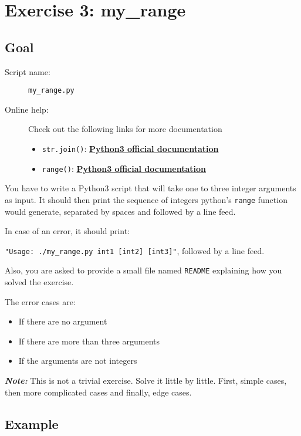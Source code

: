 \documentclass[12pt]{article}
\let\oldhref\href
\renewcommand{\href}[2]{\oldhref{#1}{\bfseries#2}}
\begin{document}
\section{Exercise 3: my\_range}
\subsection{Goal}

\begin{description}
        \item[Script name:] \texttt{my\_range.py}
        \item[Online help:] Check out the following links for more documentation
	\begin{itemize}
		\item \texttt{str.join()}: \href{https://docs.python.org/3.5/library/stdtypes.html\#str.join}{Python3 official documentation}
		\item \texttt{range()}: \href{https://docs.python.org/3.5/library/stdtypes.html\#range}{Python3 official documentation}
	\end{itemize}
\end{description}

You have to write a Python3 script that will take one to three integer arguments as input.
It should then print the sequence of integers python's \texttt{range} function would generate, separated by spaces and followed by a line feed.

In case of an error, it should print:

\texttt{"Usage: ./my\_range.py int1 [int2] [int3]"}, followed by a line feed.

Also, you are asked to provide a small file named \texttt{README} explaining how you solved the exercise.

The error cases are:

\begin{itemize}
	\item If there are no argument
	\item If there are more than three arguments
	\item If the arguments are not integers
\end{itemize}

\textit{\textbf{Note:}} This is not a trivial exercise. Solve it little by little. First, simple cases, then more complicated cases and finally, edge cases.

\subsection{Example}
\end{document}

